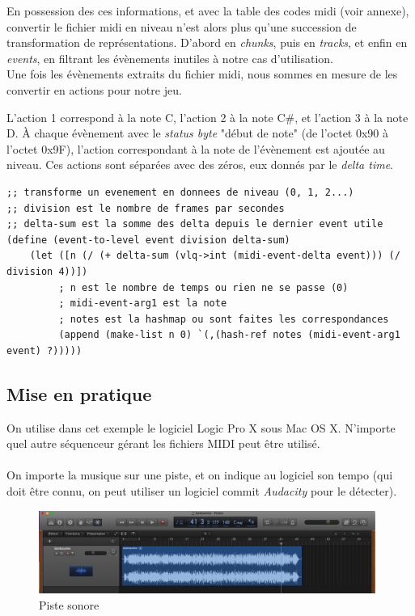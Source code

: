 En possession des ces informations, et avec la table des codes midi (voir annexe), convertir le fichier midi en niveau n'est alors plus qu'une succession de transformation de représentations. D'abord en \textit{chunks}, puis en \textit{tracks}, et enfin en \textit{events}, en filtrant les évènements inutiles à notre cas d'utilisation.\\
Une fois les évènements extraits du fichier midi, nous sommes en mesure de les convertir en actions pour notre jeu.

L'action 1 correspond à la note C, l'action 2 à la note C\#, et l'action 3 à la note D.
À chaque évènement avec le \textit{status byte} "début de note" (de l'octet 0x90 à l'octet 0x9F), l'action correspondant à la note de l'évènement est ajoutée au niveau. Ces actions sont séparées avec des zéros, eux donnés par le \textit{delta time}.\\

\begin{lstlisting}[style=Scheme]
;; transforme un evenement en donnees de niveau (0, 1, 2...)
;; division est le nombre de frames par secondes
;; delta-sum est la somme des delta depuis le dernier event utile
(define (event-to-level event division delta-sum)
    (let ([n (/ (+ delta-sum (vlq->int (midi-event-delta event))) (/ division 4))])
         ; n est le nombre de temps ou rien ne se passe (0)
         ; midi-event-arg1 est la note
         ; notes est la hashmap ou sont faites les correspondances
         (append (make-list n 0) `(,(hash-ref notes (midi-event-arg1 event) ?)))))
\end{lstlisting}


\subsection{Mise en pratique}
On utilise dans cet exemple le logiciel Logic Pro X sous Mac OS X. N'importe quel autre séquenceur gérant les fichiers MIDI peut être utilisé.\\

\paragraph{}
On importe la musique sur une piste, et on indique au logiciel son tempo (qui doit être connu, on peut utiliser un logiciel commit \textit{Audacity} pour le détecter).

\begin{figure}[H]\centering
  \includegraphics[width=11cm]{./img/logic_sound.png}
  \caption{Piste sonore}
  \label{transitions_scenes}
\end{figure}


